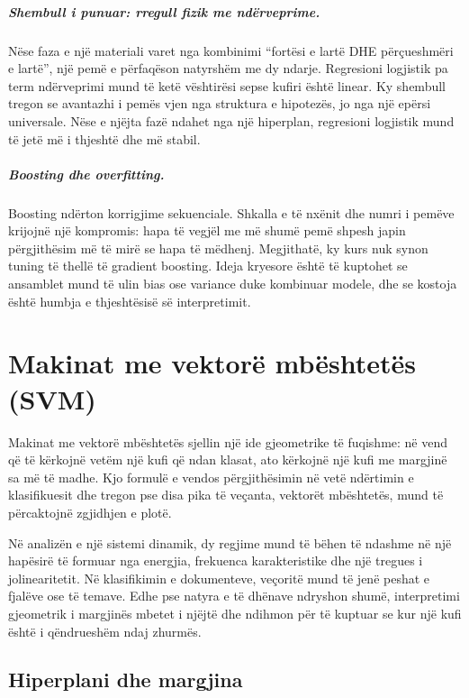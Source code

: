 \documentclass[12pt,a4paper,oneside]{book}
\begin{document}
\paragraph{Shembull i punuar: rregull fizik me ndërveprime.}
Nëse faza e një materiali varet nga kombinimi ``fortësi e lartë DHE përçueshmëri e lartë'', një pemë e përfaqëson natyrshëm me dy ndarje. Regresioni logjistik pa term ndërveprimi mund të ketë vështirësi sepse kufiri është linear. Ky shembull tregon se avantazhi i pemës vjen nga struktura e hipotezës, jo nga një epërsi universale. Nëse e njëjta fazë ndahet nga një hiperplan, regresioni logjistik mund të jetë më i thjeshtë dhe më stabil.

\paragraph{Boosting dhe overfitting.}
Boosting ndërton korrigjime sekuenciale. Shkalla e të nxënit dhe numri i pemëve krijojnë një kompromis: hapa të vegjël me më shumë pemë shpesh japin përgjithësim më të mirë se hapa të mëdhenj. Megjithatë, ky kurs nuk synon tuning të thellë të gradient boosting. Ideja kryesore është të kuptohet se ansamblet mund të ulin bias ose variance duke kombinuar modele, dhe se kostoja është humbja e thjeshtësisë së interpretimit.

\chapter[SVM]{Makinat me vektorë mbështetës (SVM)}

Makinat me vektorë mbështetës sjellin një ide gjeometrike të fuqishme: në vend që të kërkojnë vetëm një kufi që ndan klasat, ato kërkojnë një kufi me margjinë sa më të madhe. Kjo formulë e vendos përgjithësimin në vetë ndërtimin e klasifikuesit dhe tregon pse disa pika të veçanta, vektorët mbështetës, mund të përcaktojnë zgjidhjen e plotë.

Në analizën e një sistemi dinamik, dy regjime mund të bëhen të ndashme në një hapësirë të formuar nga energjia, frekuenca karakteristike dhe një tregues i jolinearitetit. Në klasifikimin e dokumenteve, veçoritë mund të jenë peshat e fjalëve ose të temave. Edhe pse natyra e të dhënave ndryshon shumë, interpretimi gjeometrik i margjinës mbetet i njëjtë dhe ndihmon për të kuptuar se kur një kufi është i qëndrueshëm ndaj zhurmës.
\section{Hiperplani dhe margjina}
\end{document}

